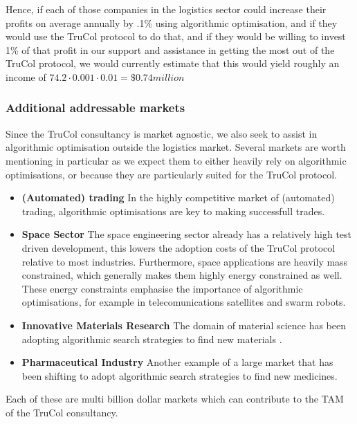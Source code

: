 Hence, if each of those companies in the logistics sector could increase their profits on average annually by .1\% using algorithmic optimisation, and if they would use the TruCol protocol to do that, and if they would be willing to invest 1\% of that profit in our support and assistance in getting the most out of the TruCol protocol, we would currently estimate that this would yield roughly an income of $74.2\cdot 0.001\cdot 0.01=\$0.74 million$

\subsubsection{Additional addressable markets}
Since the TruCol consultancy is market agnostic, we also seek to assist in algorithmic optimisation outside the logistics market. Several markets are worth mentioning in particular as we expect them to either heavily rely on algorithmic optimisations, or because they are particularly suited for the TruCol protocol.
\begin{itemize}
	\item \textbf{(Automated) trading} In the highly competitive market of (automated) trading, algorithmic optimisations are key to making successfull trades. 
	\item \textbf{Space Sector} The space engineering sector already has a relatively high test driven development\cite{todo}, this lowers the adoption costs of the TruCol protocol relative to most industries. Furthermore, space applications are heavily mass constrained, which generally makes them highly energy constrained as well. These energy constraints emphasise the importance of algorithmic optimisations, for example in telecomunications satellites and swarm robots.
	\item \textbf{Innovative Materials Research} The domain of material science has been adopting algorithmic search strategies to find new materials  \cite{allahyari2020coevolutionary}.
	\item \textbf{Pharmaceutical Industry} Another example of a large market that has been shifting to adopt algorithmic search strategies to find new medicines.
\end{itemize}
Each of these are multi billion dollar markets which can contribute to the TAM of the TruCol consultancy.
